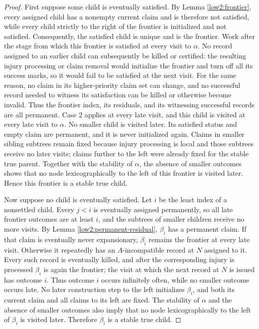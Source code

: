 \documentclass[10pt,a4paper]{amsart}
\begin{document}
\begin{proof}
First suppose some child is eventually satisfied. By Lemma
\ref{low2:frontier}, every assigned child has a nonempty current claim and is
therefore not satisfied, while every child strictly to the right of the
frontier is initialized and not satisfied. Consequently, the satisfied child
is unique and is the frontier.
Work after the stage from which this frontier is satisfied at every visit to
$\alpha$. No record assigned to an earlier child can subsequently be killed
or certified: the resulting injury processing or claim removal would
initialize the frontier and turn off all its success marks, so it would fail
to be satisfied at the next visit. For the same reason, no claim in its
higher-priority claim set can change, and no successful record needed to
witness its satisfaction can be killed or otherwise become invalid. Thus the
frontier index, its residuals, and its witnessing successful records are all
permanent. Case 2 applies at every late visit,
and this child is visited at every late visit to $\alpha$. No smaller child
is visited later. Its satisfied status and empty claim are permanent, and it
is never initialized again. Claims in smaller sibling subtrees remain fixed
because injury processing is local and those subtrees receive no later
visits; claims further to the left were already fixed for the stable true
parent. Together with the stability of $\alpha$, the absence of smaller
outcomes shows that no node lexicographically to the left of this frontier is
visited later. Hence this frontier is a stable true child.

Now suppose no child is eventually satisfied. Let $i$ be the least index of a
nonsettled child. Every $j<i$ is eventually assigned permanently, so all late
frontier outcomes are at least $i$, and the subtrees of smaller children
receive no more visits. By Lemma \ref{low2:permanent-residual}, $\beta_i$ has
a permanent claim. If that claim is eventually never expansionary,
$\beta_i$ remains the frontier at every late visit. Otherwise it repeatedly
has an $A$-incompatible record at $N$ assigned to it. Every such record is eventually killed,
and after the corresponding injury is processed $\beta_i$ is again the
frontier; the visit at which the next record at $N$ is issued has outcome $i$.
Thus outcome $i$ occurs infinitely often, while no smaller outcome occurs
late. No later construction step to the left initializes $\beta_i$, and both
its current claim and all claims to its left are fixed.
The stability of $\alpha$ and the absence of smaller outcomes also imply that
no node lexicographically to the left of $\beta_i$ is visited later.
Therefore $\beta_i$ is a stable true child.
\end{proof}
\end{document}
